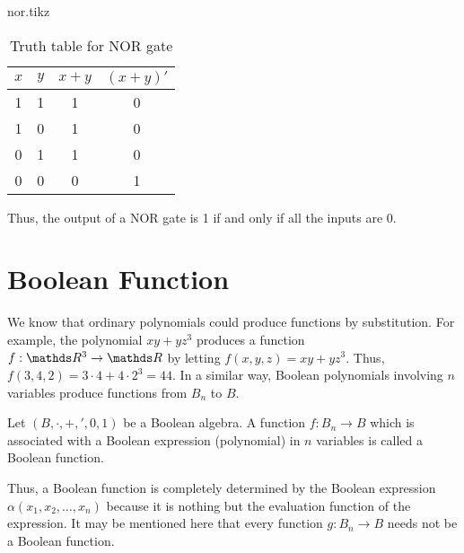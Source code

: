 \documentclass[../main-sheet.tex]{subfiles}
\begin{document}
	\begin{table}[H]
        \begin{minipage}[c]{0.5\textwidth}
            \centering
            {nor.tikz}
        \end{minipage}\hfill
        \begin{minipage}[c]{0.5\textwidth}
            \centering
            \begin{tabular}{cccc}
                \toprule
                $ x $ &$ y $& $ x+y $& $ (x+y)' $ \\
                \midrule
                1 & 1 & 1 & 0\\
                1 & 0 & 1 & 0\\
                0 & 1 & 1 & 0\\
                0 & 0 & 0 & 1\\
                \bottomrule
            \end{tabular}
            \caption{Truth table for NOR gate}
        \end{minipage}
    \end{table}
    Thus, the output of a NOR gate is 1 if and only if all the inputs are 0.
\section{Boolean Function}
We know that ordinary polynomials could produce functions by substitution. For example, the polynomial $ xy+yz^3 $ produces a function $ f:\R^3\to\R $ by letting $ f(x,y,z)=xy+yz^3 $. Thus, $ f(3,4,2)=3\cdot 4+4\cdot 2^3=44 $. In a similar way, Boolean polynomials involving $ n $ variables produce functions from $ B_n $ to $ B $.
\begin{defn}
    Let $ (B,\cdot,+,',0,1) $ be a Boolean algebra. A function $ f:B_n\to B $ which is associated with a Boolean expression (polynomial) in $ n $ variables is called a Boolean function.
\end{defn}
Thus, a Boolean function is completely determined by the Boolean expression $ \alpha (x_1,x_2,\dots, x_n) $ because it is nothing but the evaluation function of the expression. It may be mentioned here that every function $ g:B_n\to B $ needs not be a Boolean function.
\end{document}
